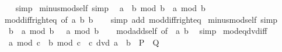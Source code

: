 \begin{isabellebody}
\ \ \isamarkupfalse%
\ simp%
\endisatagproof
{\isafoldproof}%
%
\isadelimproof
\isanewline
%
\endisadelimproof
\isanewline
{}\isamarkupfalse%
\ minus{\isacharunderscore}{\kern0pt}mod{\isacharunderscore}{\kern0pt}self{}\ {\isacharbrackleft}{\kern0pt}simp{\isacharbrackright}{\kern0pt}{\isacharcolon}{\kern0pt}\isanewline
\ \ {\isachardoublequoteopen}{\isacharparenleft}{\kern0pt}a\ {\isacharminus}{\kern0pt}\ b{\isacharparenright}{\kern0pt}\ mod\ b\ {\isacharequal}{\kern0pt}\ a\ mod\ b{\isachardoublequoteclose}\isanewline
%
\isadelimproof
\ \ %
\endisadelimproof
%
\isatagproof
{}\isamarkupfalse%
\ mod{\isacharunderscore}{\kern0pt}diff{\isacharunderscore}{\kern0pt}right{\isacharunderscore}{\kern0pt}eq\ {\isacharbrackleft}{\kern0pt}of\ a\ b\ b{\isacharbrackright}{\kern0pt}\isanewline
\ \ \isamarkupfalse%
\ {\isacharparenleft}{\kern0pt}simp\ add{\isacharcolon}{\kern0pt}\ mod{\isacharunderscore}{\kern0pt}diff{\isacharunderscore}{\kern0pt}right{\isacharunderscore}{\kern0pt}eq{\isacharparenright}{\kern0pt}%
\endisatagproof
{\isafoldproof}%
%
\isadelimproof
\isanewline
%
\endisadelimproof
\isanewline
{}\isamarkupfalse%
\ minus{\isacharunderscore}{\kern0pt}mod{\isacharunderscore}{\kern0pt}self{}\ {\isacharbrackleft}{\kern0pt}simp{\isacharbrackright}{\kern0pt}{\isacharcolon}{\kern0pt}\isanewline
\ \ {\isachardoublequoteopen}{\isacharparenleft}{\kern0pt}b\ {\isacharminus}{\kern0pt}\ a{\isacharparenright}{\kern0pt}\ mod\ b\ {\isacharequal}{\kern0pt}\ {\isacharminus}{\kern0pt}\ a\ mod\ b{\isachardoublequoteclose}\isanewline
%
\isadelimproof
\ \ %
\endisadelimproof
%
\isatagproof
{}\isamarkupfalse%
\ mod{\isacharunderscore}{\kern0pt}add{\isacharunderscore}{\kern0pt}self{}\ {\isacharbrackleft}{\kern0pt}of\ {\isachardoublequoteopen}{\isacharminus}{\kern0pt}\ a{\isachardoublequoteclose}\ b{\isacharbrackright}{\kern0pt}\ \isamarkupfalse%
\ simp%
\endisatagproof
{\isafoldproof}%
%
\isadelimproof
\isanewline
%
\endisadelimproof
\isanewline
{}\isamarkupfalse%
\ mod{\isacharunderscore}{\kern0pt}eq{\isacharunderscore}{\kern0pt}dvd{\isacharunderscore}{\kern0pt}iff{\isacharcolon}{\kern0pt}\isanewline
\ \ {\isachardoublequoteopen}a\ mod\ c\ {\isacharequal}{\kern0pt}\ b\ mod\ c\ {\isasymlongleftrightarrow}\ c\ dvd\ a\ {\isacharminus}{\kern0pt}\ b{\isachardoublequoteclose}\ {\isacharparenleft}{\kern0pt}\ {\isachardoublequoteopen}{\isacharquery}{\kern0pt}P\ {\isasymlongleftrightarrow}\ {\isacharquery}{\kern0pt}Q{\isachardoublequoteclose}{\isacharparenright}{\kern0pt}\isanewline

\end{isabellebody}
